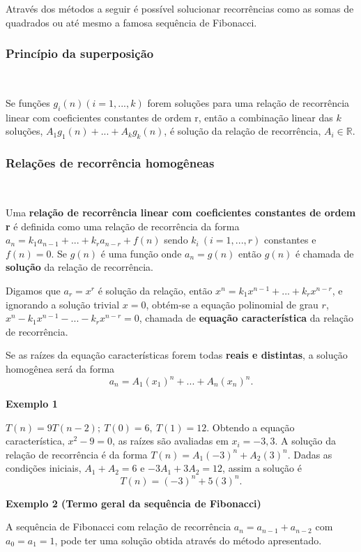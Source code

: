 Através dos métodos a seguir é possível solucionar recorrências como as somas de quadrados ou até mesmo a famosa sequência de Fibonacci.

\subsubsection{Princípio da superposição}
\

Se funções $g_i(n) (i = 1, ..., k)$ forem soluções para uma relação de recorrência linear com coeficientes constantes de ordem r, então a combinação linear das $k$ soluções, $A_1g_1(n) + ... + A_kg_k(n)$, é solução da relação de recorrência, $A_i \in \mathbb{R}$.

\subsubsection{Relações de recorrência homogêneas}
\

Uma \textbf{relação de recorrência linear com coeficientes constantes de ordem r} é definida como uma relação de recorrência da forma $a_n = k_1a_{n-1}+...+k_ra_{n-r} + f(n)$ sendo $k_i \ (i = 1, ... , r)$ constantes e $f(n) = 0$. Se $g(n)$ é uma função onde $a_n=g(n)$ então $g(n)$ é chamada de \textbf{solução} da relação de recorrência.

Digamos que $a_r = x^r$ é solução da relação, então $x^n = k_1x^{n-1}+...+k_rx^{n-r}$, e ignorando a solução trivial $x=0$, obtém-se a equação polinomial de grau $r$, $x^n - k_1x^{n-1}-...-k_rx^{n-r} = 0$, chamada de \textbf{equação característica} da relação de recorrência.

Se as raízes da equação características forem todas \textbf{reais e distintas}, a solução homogênea será da forma
\[a_n = A_1(x_1)^n + ... + A_n(x_n)^n.\]

\textbf{Exemplo 1}

$T(n) = 9T(n-2); \ T(0) = 6,  \ T(1) = 12$. Obtendo a equação característica, $x^2 - 9 = 0$, as raízes são avaliadas em $x_i = {-3,3}$. A solução da relação de recorrência é da forma $T(n) = A_1(-3)^n + A_2(3)^n$. Dadas as condições iniciais, $A_1 + A_2 = 6$ e $-3A_1 + 3A_2 = 12$, assim a solução é 
\[T(n) = (-3)^n + 5(3)^n.\]

\textbf{Exemplo 2 (Termo geral da sequência de Fibonacci)}

A sequência de Fibonacci com relação de recorrência $a_n = a_{n-1} + a_{n-2}$ com $a_0 = a_1 = 1$, pode ter uma solução obtida através do método apresentado.

